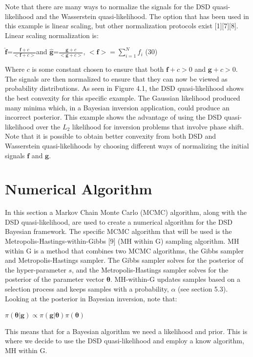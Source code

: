 \documentclass[botnum, fleqn]{unmeethesis}
\begin{document}
Note that there are many ways to normalize the signals for the DSD quasi-likelihood and the Wasserstein quasi-likelihood. The option that has been used in this example is linear scaling, but other normalization protocols exist [1][7][8]. Linear scaling normalization is:

\hspace{\fill}$\widehat{\bm{f}}$=\Large$\frac{\bm{f}+c}{<\bm{f}+c>}$\normalsize \hspace{0.5cm}and \hspace{0.5cm}$\widehat{\bm{g}}$=\Large$\frac{\bm{g}+c}{<\bm{g}+c>}$, \vspace{0.5cm}\normalsize $<\bm{f}>=\sum_{i=1}^{N}f_i$\hspace{\fill} \normalsize (30)

Where $c$ is some constant chosen to ensure that both $\bm{f}+c>0$ and $\bm{g}+c>0$. The signals are then normalized to ensure that they can now be viewed as probability distributions. 
As seen in Figure 4.1, the DSD quasi-likelihood shows the best convexity for this specific example. The Gaussian likelihood produced many minima which, in a Bayesian inversion application, could produce an incorrect posterior. This example shows the advantage of using the DSD quasi-likelihood over the $L_2$ likelihood for inversion problems that involve phase shift. Note that it is possible to obtain better convexity from both DSD and Wasserstein quasi-likelihoods by choosing different ways of normalizing the initial signals $\bm{f}$ and $\bm{g}$.

\chapter{Numerical Algorithm}
In this section a Markov Chain Monte Carlo (MCMC) algorithm, along with the DSD quasi-likelihood, are used to create a numerical algorithm for the DSD Bayesian framework. The specific MCMC algorithm that will be used is the Metropolis-Hastings-within-Gibbs [9] (MH within G) sampling algorithm. MH within G is a method that combines two MCMC algorithms, the Gibbs sampler and Metropolis-Hastings sampler. The Gibbs sampler solves for the posterior of the hyper-parameter $s$, and the Metropolis-Hastings sampler solves for the posterior of the parameter vector $\bm{\theta}$. MH-within-G updates samples based on a selection process and keeps samples with a probability, $\alpha$ (see section 5.3). Looking at the posterior in Bayesian inversion, note that:
\begin{center}
	$\pi(\bm{\theta}|\bm{g}) \propto \pi(\bm{g}|\bm{\theta})\pi(\bm{\theta})$
\end{center}
This means that for a Bayesian algorithm we need a likelihood and prior. This is where we decide to use the DSD quasi-likelihood and employ a know algorithm, MH within G. 
\\
\end{document}
